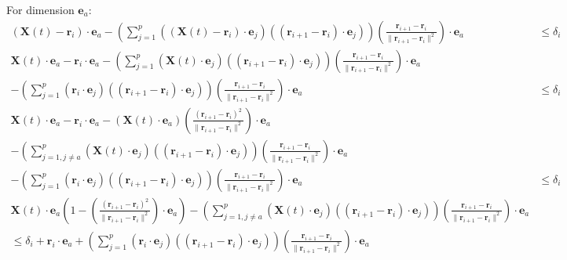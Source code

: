 \documentclass[11pt]{article}
\begin{document}
For dimension $\mathbf{e}_a$: 
\begin{align*}
(\mathbf{X}(t) - \mathbf{r}_i) \cdot \mathbf{e}_a - \left( \sum_{j = 1}^{p}  {((\mathbf{X}(t) - \mathbf{r}_i) \cdot \mathbf{e}_j)(( \mathbf{r}_{i+1} - \mathbf{r}_i ) \cdot \mathbf{e}_j)} \right) (\frac{ \mathbf{r}_{i+1} - \mathbf{r}_i } { \| \mathbf{r}_{i+1} - \mathbf{r}_i \|^2 }) \cdot \mathbf{e}_a & \le \delta_i \\
\mathbf{X}(t) \cdot \mathbf{e}_a - \mathbf{r}_i \cdot \mathbf{e}_a - \left( \sum_{j = 1}^{p}  {(\mathbf{X}(t) \cdot \mathbf{e}_j)(( \mathbf{r}_{i+1} - \mathbf{r}_i ) \cdot \mathbf{e}_j)} \right) (\frac{ \mathbf{r}_{i+1} - \mathbf{r}_i } { \| \mathbf{r}_{i+1} - \mathbf{r}_i \|^2 }) \cdot \mathbf{e}_a &\\
- \left( \sum_{j = 1}^{p}  {(\mathbf{r}_i \cdot \mathbf{e}_j)(( \mathbf{r}_{i+1} - \mathbf{r}_i ) \cdot \mathbf{e}_j)} \right) (\frac{ \mathbf{r}_{i+1} - \mathbf{r}_i } { \| \mathbf{r}_{i+1} - \mathbf{r}_i \|^2 }) \cdot \mathbf{e}_a & \le \delta_i \\
 \mathbf{X}(t) \cdot \mathbf{e}_a - \mathbf{r}_i \cdot \mathbf{e}_a - (\mathbf{X}(t) \cdot \mathbf{e}_a) (\frac{ (\mathbf{r}_{i+1} - \mathbf{r}_i)^2 } { \| \mathbf{r}_{i+1} - \mathbf{r}_i \|^2 }) \cdot \mathbf{e}_a  &\\
 - \left( \sum_{j = 1, j \ne a}^{p}  {(\mathbf{X}(t) \cdot \mathbf{e}_j)(( \mathbf{r}_{i+1} - \mathbf{r}_i ) \cdot \mathbf{e}_j)} \right) (\frac{ \mathbf{r}_{i+1} - \mathbf{r}_i } { \| \mathbf{r}_{i+1} - \mathbf{r}_i \|^2 }) \cdot \mathbf{e}_a &\\
- \left( \sum_{j = 1}^{p}  {(\mathbf{r}_i \cdot \mathbf{e}_j)(( \mathbf{r}_{i+1} - \mathbf{r}_i ) \cdot \mathbf{e}_j)} \right) (\frac{ \mathbf{r}_{i+1} - \mathbf{r}_i } { \| \mathbf{r}_{i+1} - \mathbf{r}_i \|^2 }) \cdot \mathbf{e}_a & \le \delta_i \\
\mathbf{X}(t) \cdot \mathbf{e}_a \left( 1 - (\frac{ (\mathbf{r}_{i+1} - \mathbf{r}_i)^2 } { \| \mathbf{r}_{i+1} - \mathbf{r}_i \|^2 }) \cdot \mathbf{e}_a \right) - \left( \sum_{j = 1, j \ne a}^{p}  {(\mathbf{X}(t) \cdot \mathbf{e}_j)(( \mathbf{r}_{i+1} - \mathbf{r}_i ) \cdot \mathbf{e}_j)} \right) (\frac{ \mathbf{r}_{i+1} - \mathbf{r}_i } { \| \mathbf{r}_{i+1} - \mathbf{r}_i \|^2 }) \cdot \mathbf{e}_a &\\
  \le \delta_i + \mathbf{r}_i \cdot \mathbf{e}_a +  \left( \sum_{j = 1}^{p}  {(\mathbf{r}_i \cdot \mathbf{e}_j)(( \mathbf{r}_{i+1} - \mathbf{r}_i ) \cdot \mathbf{e}_j)} \right) (\frac{ \mathbf{r}_{i+1} - \mathbf{r}_i } { \| \mathbf{r}_{i+1} - \mathbf{r}_i \|^2 }) \cdot \mathbf{e}_a & 
\end{align*}
\end{document}
